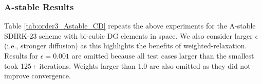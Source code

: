 \documentclass[VANCOUVER,STIX1COL]{WileyNJD-v2}
\begin{document}

\subsubsection{A-stable Results}
\label{sec:astable}

Table \ref{tab:order3_Astable_CD} repeats the above experiments for the A-stable 
SDIRK-23 scheme with bi-cubic DG elements in space. We also consider larger $\epsilon$ (i.e., stronger diffusion) as
this highlights the benefits of weighted-relaxation. Results for $\epsilon =
0.001$ are omitted because all test cases larger than the smallest took
125+ iterations. Weights larger than 1.0 are also omitted as they did not improve
convergence.
\end{document}
